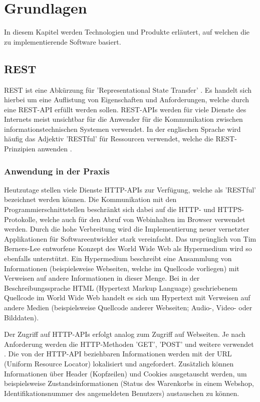 \chapter{Grundlagen}
\label{cha:grundlagen}

In diesem Kapitel werden Technologien und Produkte erläutert, auf welchen die zu implementierende Software basiert.

\section{REST}

REST ist eine Abkürzung für 'Representational State Transfer' \cite[S. 76 ff.]{rest}. Es handelt sich hierbei um eine Auflistung von Eigenschaften und Anforderungen, welche durch eine REST-API erfüllt werden sollen. REST-APIs werden für viele Dienste des Internets meist unsichtbar für die Anwender für die Kommunikation zwischen informationstechnischen Systemen verwendet. In der englischen Sprache wird häufig das Adjektiv 'RESTful' für Ressourcen verwendet, welche die REST-Prinzipien anwenden \cite[S. 277]{swdev}.

\subsection{Anwendung in der Praxis}

Heutzutage stellen viele Dienste HTTP-APIs zur Verfügung, welche als 'RESTful' bezeichnet werden können. Die Kommunikation mit den Programmierschnittstellen beschränkt sich dabei auf die HTTP- und HTTPS-Protokolle, welche auch für den Abruf von Webinhalten im Browser verwendet werden. Durch die hohe Verbreitung wird die Implementierung neuer vernetzter Applikationen für Softwareentwickler stark vereinfacht. Das ursprünglich von Tim Berners-Lee entworfene Konzept des World Wide Web als Hypermedium wird so ebenfalls unterstützt. Ein Hypermedium beschreibt eine Ansammlung von Informationen (beispielsweise Webseiten, welche im Quellcode vorliegen) mit Verweisen auf andere Informationen in dieser Menge. Bei in der Beschreibungssprache HTML (Hypertext Markup Language) geschriebenem Quellcode im World Wide Web handelt es sich um Hypertext mit Verweisen auf andere Medien (beispielsweise Quellcode anderer Webseiten; Audio-, Video- oder Bilddaten). 

Der Zugriff auf HTTP-APIs erfolgt analog zum Zugriff auf Webseiten. Je nach Anforderung werden die HTTP-Methoden 'GET', 'POST' und weitere verwendet \cite[S. 279]{swdev}. Die von der HTTP-API beziehbaren Informationen werden mit der URL (Uniform Resource Locator) lokalisiert und angefordert. Zusätzlich können Informationen über Header (Kopfzeilen) und Cookies ausgetauscht werden, um beispielsweise Zustandsinformationen (Status des Warenkorbs in einem Webshop, Identifikationsnummer des angemeldeten Benutzers) austauschen zu können.

